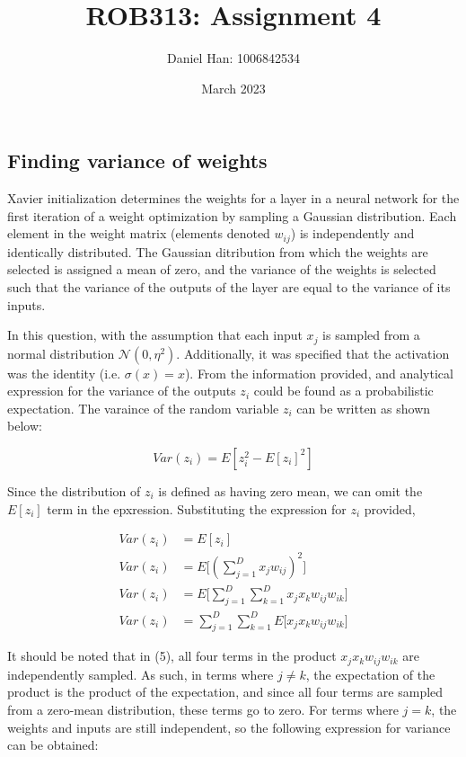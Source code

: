 

\title{ROB313: Assignment 4}
\author{Daniel Han: 1006842534}
\date{March 2023}



\maketitle


\subsection{Finding variance of weights}
Xavier initialization determines the weights for a layer in a neural network for the first iteration of a weight optimization by sampling a Gaussian distribution. Each element in the weight matrix (elements denoted $w_{ij}$) is independently and identically distributed. The Gaussian ditribution from which the weights are selected is assigned a mean of zero, and the variance of the weights is selected such that the variance of the outputs of the layer are equal to the variance of its inputs.

In this question, with the assumption that each input $x_j$ is sampled from a normal distribution $\mathcal{N}(0, \eta^2)$. Additionally, it was specified that the activation was the identity (i.e. $\sigma (x) = x$). From the information provided, and analytical expression for the variance of the outputs $z_i$ could be found as a probabilistic expectation. The varaince of the random variable $z_i$ can be written as shown below:

\begin{equation}
Var(z_i) = E[z_{i}^{2}- E[z_i]^2]
\end{equation}

Since the distribution of $z_i$ is defined as having zero mean, we can omit the $E[z_i]$ term in the epxression. Substituting the expression for $z_i$ provided,

\begin{align}
Var(z_i) &= E[z_i] \\
Var(z_i) &= E\Big[(\sum_{j=1}^{D} x_j w_{ij})^2\Big]\\
Var(z_i) &= E\Big[\sum_{j=1}^{D} \sum_{k=1}^{D} x_j x_k w_{ij} w_{ik}\Big]\\
Var(z_i) &= \sum_{j=1}^{D} \sum_{k=1}^{D} E \Big[x_j x_k w_{ij} w_{ik}\Big]
\end{align}

It should be noted that in (5), all four terms in the product $x_j x_k w_{ij} w_{ik}$ are independently sampled. As such, in terms where $j \neq k$, the expectation of the product is the product of the expectation, and since all four terms are sampled from a zero-mean distribution, these terms go to zero. For terms where $j=k$, the weights and inputs are still independent, so the following expression for variance can be obtained:

